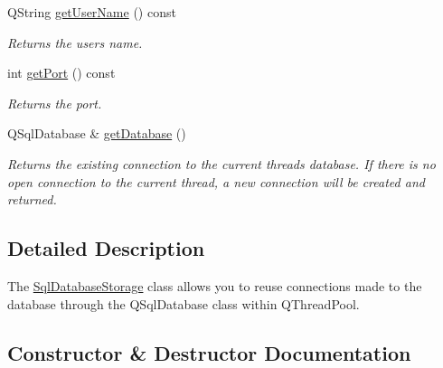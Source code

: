 \begin{DoxyCompactItemize}
\mbox{\label{class_sql_database_storage_afc4b98c1eb06e868ce0b317aa381a899}} 
Q\+String \hyperlink{class_sql_database_storage_afc4b98c1eb06e868ce0b317aa381a899}{get\+User\+Name} () const
\begin{DoxyCompactList}\small\item\em Returns the user\textquotesingle{}s name. \end{DoxyCompactList}\item 
\mbox{\label{class_sql_database_storage_acf0079bd639d2e4ba91c9b007a6af263}} 
int \hyperlink{class_sql_database_storage_acf0079bd639d2e4ba91c9b007a6af263}{get\+Port} () const
\begin{DoxyCompactList}\small\item\em Returns the port. \end{DoxyCompactList}\item 
\mbox{\label{class_sql_database_storage_a4184a8138d1f65bc644825f587436aea}} 
Q\+Sql\+Database \& \hyperlink{class_sql_database_storage_a4184a8138d1f65bc644825f587436aea}{get\+Database} ()
\begin{DoxyCompactList}\small\item\em Returns the existing connection to the current thread\textquotesingle{}s database. If there is no open connection to the current thread, a new connection will be created and returned. \end{DoxyCompactList}\end{DoxyCompactItemize}


\subsection{Detailed Description}
The \hyperlink{class_sql_database_storage}{Sql\+Database\+Storage} class allows you to reuse connections made to the database through the Q\+Sql\+Database class within Q\+Thread\+Pool. 

\subsection{Constructor \& Destructor Documentation}
\mbox{\label{class_sql_database_storage_a691465c618b8050f5c67543f57fc4d15}} 
